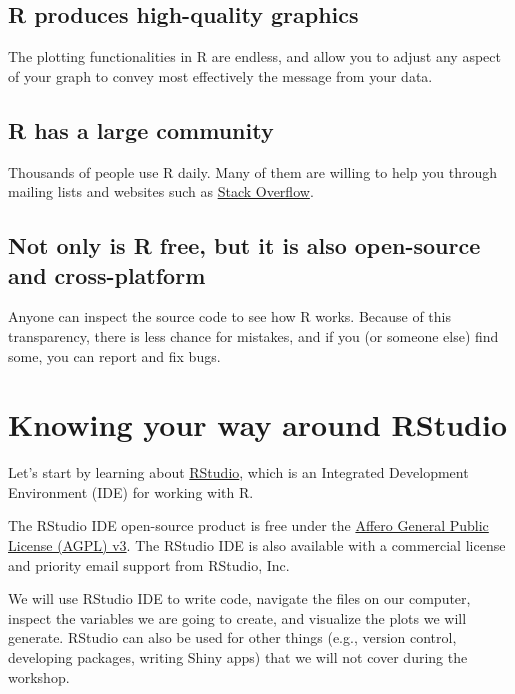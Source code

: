 \documentclass[
]{book}
\begin{document}
\hypertarget{r-produces-high-quality-graphics}{%
\subsection{R produces high-quality graphics}\label{r-produces-high-quality-graphics}}

The plotting functionalities in R are endless, and allow you to adjust any
aspect of your graph to convey most effectively the message from your data.

\hypertarget{r-has-a-large-community}{%
\subsection{R has a large community}\label{r-has-a-large-community}}

Thousands of people use R daily. Many of them are willing to help you through
mailing lists and websites such as \href{https://stackoverflow.com/questions/tagged/r}{Stack Overflow}.

\hypertarget{not-only-is-r-free-but-it-is-also-open-source-and-cross-platform}{%
\subsection{Not only is R free, but it is also open-source and cross-platform}\label{not-only-is-r-free-but-it-is-also-open-source-and-cross-platform}}

Anyone can inspect the source code to see how R works. Because of this
transparency, there is less chance for mistakes, and if you (or someone else)
find some, you can report and fix bugs.

\hypertarget{knowing-your-way-around-rstudio}{%
\section{Knowing your way around RStudio}\label{knowing-your-way-around-rstudio}}

Let's start by learning about \href{https://www.rstudio.com/}{RStudio}, which is an
Integrated Development Environment (IDE) for working with R.

The RStudio IDE open-source product is free under the
\href{https://www.gnu.org/licenses/agpl-3.0.en.html}{Affero General Public License (AGPL) v3}.
The RStudio IDE is also available with a commercial license and priority email
support from RStudio, Inc.

We will use RStudio IDE to write code, navigate the files on our computer,
inspect the variables we are going to create, and visualize the plots we will
generate. RStudio can also be used for other things (e.g., version control,
developing packages, writing Shiny apps) that we will not cover during the
workshop.
\end{document}

